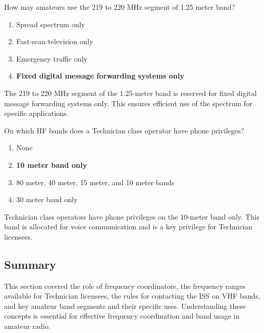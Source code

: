 
\begin{tcolorbox}[colback=gray!10!white,colframe=black!75!black,title={T1B05}]
    How may amateurs use the 219 to 220 MHz segment of 1.25 meter band?
    \begin{enumerate}[label=\Alph*,noitemsep]
        \item Spread spectrum only
        \item Fast-scan television only
        \item Emergency traffic only
        \item \textbf{Fixed digital message forwarding systems only}
    \end{enumerate}
\end{tcolorbox}
The 219 to 220 MHz segment of the 1.25-meter band is reserved for fixed digital message forwarding systems only. This ensures efficient use of the spectrum for specific applications.


\begin{tcolorbox}[colback=gray!10!white,colframe=black!75!black,title={T1B06}]
    On which HF bands does a Technician class operator have phone privileges?
    \begin{enumerate}[label=\Alph*,noitemsep]
        \item None
        \item \textbf{10 meter band only}
        \item 80 meter, 40 meter, 15 meter, and 10 meter bands
        \item 30 meter band only
    \end{enumerate}
\end{tcolorbox}
Technician class operators have phone privileges on the 10-meter band only. This band is allocated for voice communication and is a key privilege for Technician licensees.


\subsection*{Summary}
This section covered the role of frequency coordinators, the frequency ranges available for Technician licensees, the rules for contacting the ISS on VHF bands, and key amateur band segments and their specific uses. Understanding these concepts is essential for effective frequency coordination and band usage in amateur radio.

